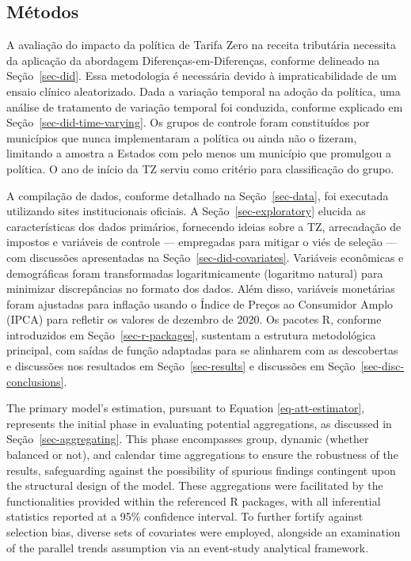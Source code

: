 \documentclass[12pt, a4paper, twoside]{article}
\numberwithin{equation}{subsection} %
\begin{document}
\hypertarget{sec-methods}{%
\subsection{Métodos}\label{sec-methods}}

A avaliação do impacto da política de Tarifa Zero na receita tributária
necessita da aplicação da abordagem Diferenças-em-Diferenças, conforme
delineado na Seção~\ref{sec-did}. Essa metodologia é necessária devido à
impraticabilidade de um ensaio clínico aleatorizado. Dada a variação
temporal na adoção da política, uma análise de tratamento de variação
temporal foi conduzida, conforme explicado em
Seção~\ref{sec-did-time-varying}. Os grupos de controle foram
constituídos por municípios que nunca implementaram a política ou ainda
não o fizeram, limitando a amostra a Estados com pelo menos um município
que promulgou a política. O ano de início da TZ serviu como critério
para classificação do grupo.

A compilação de dados, conforme detalhado na Seção~\ref{sec-data}, foi
executada utilizando sites institucionais oficiais. A
Seção~\ref{sec-exploratory} elucida as características dos dados
primários, fornecendo ideias sobre a TZ, arrecadação de impostos e
variáveis \hspace{0pt}\hspace{0pt}de controle --- empregadas para
mitigar o viés de seleção --- com discussões apresentadas na
Seção~\ref{sec-did-covariates}. Variáveis
\hspace{0pt}\hspace{0pt}econômicas e demográficas foram transformadas
logaritmicamente (logaritmo natural) para minimizar discrepâncias no
formato dos dados. Além disso, variáveis
\hspace{0pt}\hspace{0pt}monetárias foram ajustadas para inflação usando
o Índice de Preços ao Consumidor Amplo (IPCA) para refletir os valores
de dezembro de 2020. Os pacotes R, conforme introduzidos em
Seção~\ref{sec-r-packages}, sustentam a estrutura metodológica
principal, com saídas de função adaptadas para se alinharem com as
descobertas e discussões nos resultados em Seção~\ref{sec-results} e
discussões em Seção~\ref{sec-disc-conclusions}.

The primary model's estimation, pursuant to Equation
\eqref{eq-att-estimator}, represents the initial phase in evaluating
potential aggregations, as discussed in Seção~\ref{sec-aggregating}.
This phase encompasses group, dynamic (whether balanced or not), and
calendar time aggregations to ensure the robustness of the results,
safeguarding against the possibility of spurious findings contingent
upon the structural design of the model. These aggregations were
facilitated by the functionalities provided within the referenced R
packages, with all inferential statistics reported at a 95\% confidence
interval. To further fortify against selection bias, diverse sets of
covariates were employed, alongside an examination of the parallel
trends assumption via an event-study analytical framework.
\end{document}
